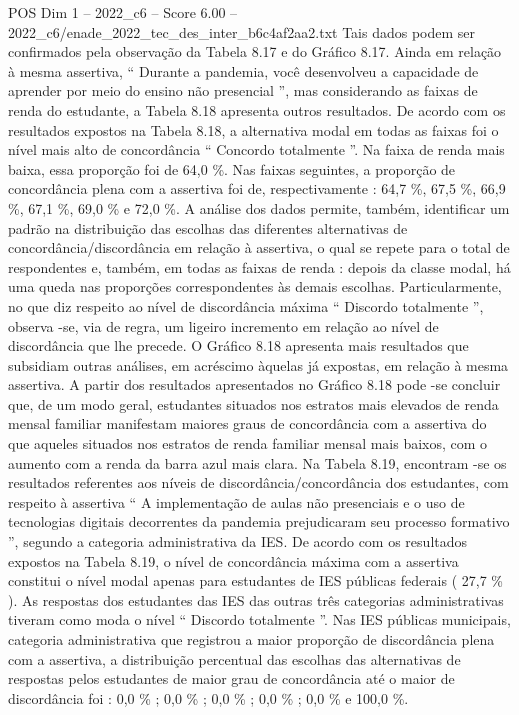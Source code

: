\begin{textsample}{POS Dim 1 – 2022\_c6 – Score 6.00 – 2022\_c6/enade\_2022\_tec\_des\_inter\_b6c4af2aa2.txt}
Tais dados podem ser confirmados pela observação da Tabela 8.17 e do Gráfico 8.17.
Ainda em relação à mesma assertiva, “ Durante a pandemia, você desenvolveu a capacidade de aprender por meio do ensino não presencial ”, mas considerando as faixas de renda do estudante, a Tabela 8.18 apresenta outros resultados.
De acordo com os resultados expostos na Tabela 8.18, a alternativa modal em todas as faixas foi o nível mais alto de concordância “ Concordo totalmente ”.
Na faixa de renda mais baixa, essa proporção foi de 64,0 \%.
Nas faixas seguintes, a proporção de concordância plena com a assertiva foi de, respectivamente : 64,7 \%, 67,5 \%, 66,9 \%, 67,1 \%, 69,0 \% e 72,0 \%.
A análise dos dados permite, também, identificar um padrão na distribuição das escolhas das diferentes alternativas de concordância/discordância em relação à assertiva, o qual se repete para o total de respondentes e, também, em todas as faixas de renda : depois da classe modal, há uma queda nas proporções correspondentes às demais escolhas.
Particularmente, no que diz respeito ao nível de discordância máxima “ Discordo totalmente ”, observa -se, via de regra, um ligeiro incremento em relação ao nível de discordância que lhe precede.
O Gráfico 8.18 apresenta mais resultados que subsidiam outras análises, em acréscimo àquelas já expostas, em relação à mesma assertiva.
A partir dos resultados apresentados no Gráfico 8.18 pode -se concluir que, de um modo geral, estudantes situados nos estratos mais elevados de renda mensal familiar manifestam maiores graus de concordância com a assertiva do que aqueles situados nos estratos de renda familiar mensal mais baixos, com o aumento com a renda da barra azul mais clara.
Na Tabela 8.19, encontram -se os resultados referentes aos níveis de discordância/concordância dos estudantes, com respeito à assertiva “ A implementação de aulas não presenciais e o uso de tecnologias digitais decorrentes da pandemia prejudicaram seu processo formativo ”, segundo a categoria administrativa da IES.
De acordo com os resultados expostos na Tabela 8.19, o nível de concordância máxima com a assertiva constitui o nível modal apenas para estudantes de IES públicas federais ( 27,7 \% ).
As respostas dos estudantes das IES das outras três categorias administrativas tiveram como moda o nível “ Discordo totalmente ”.
Nas IES públicas municipais, categoria administrativa que registrou a maior proporção de discordância plena com a assertiva, a distribuição percentual das escolhas das alternativas de respostas pelos estudantes de maior grau de concordância até o maior de discordância foi : 0,0 \% ; 0,0 \% ; 0,0 \% ; 0,0 \% ; 0,0 \% e 100,0 \%.

\end{textsample}
